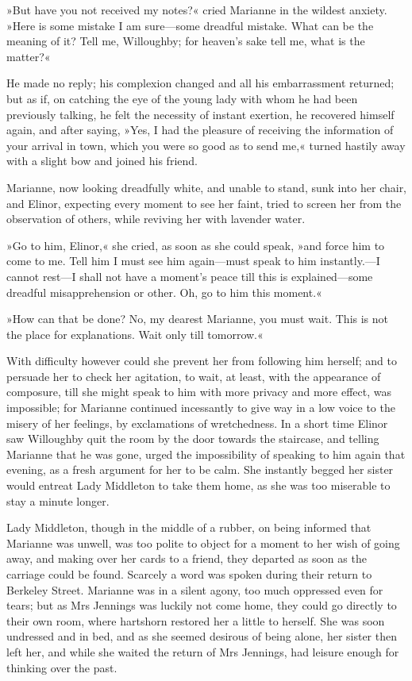 »But have you not received my notes?« cried Marianne in the wildest anxiety. »Here is some mistake I am sure—some dreadful mistake. What can be the meaning of it? Tell me, Willoughby; for heaven’s sake tell me, what is the matter?«

He made no reply; his complexion changed and all his embarrassment returned; but as if, on catching the eye of the young lady with whom he had been previously talking, he felt the necessity of instant exertion, he recovered himself again, and after saying, »Yes, I had the pleasure of receiving the information of your arrival in town, which you were so good as to send me,« turned hastily away with a slight bow and joined his friend.

Marianne, now looking dreadfully white, and unable to stand, sunk into her chair, and Elinor, expecting every moment to see her faint, tried to screen her from the observation of others, while reviving her with lavender water.

»Go to him, Elinor,« she cried, as soon as she could speak, »and force him to come to me. Tell him I must see him again—must speak to him instantly.—I cannot rest—I shall not have a moment’s peace till this is explained—some dreadful misapprehension or other. Oh, go to him this moment.«

»How can that be done? No, my dearest Marianne, you must wait. This is not the place for explanations. Wait only till tomorrow.«

With difficulty however could she prevent her from following him herself; and to persuade her to check her agitation, to wait, at least, with the appearance of composure, till she might speak to him with more privacy and more effect, was impossible; for Marianne continued incessantly to give way in a low voice to the misery of her feelings, by exclamations of wretchedness. In a short time Elinor saw Willoughby quit the room by the door towards the staircase, and telling Marianne that he was gone, urged the impossibility of speaking to him again that evening, as a fresh argument for her to be calm. She instantly begged her sister would entreat Lady Middleton to take them home, as she was too miserable to stay a minute longer.

Lady Middleton, though in the middle of a rubber, on being informed that Marianne was unwell, was too polite to object for a moment to her wish of going away, and making over her cards to a friend, they departed as soon as the carriage could be found. Scarcely a word was spoken during their return to Berkeley Street. Marianne was in a silent agony, too much oppressed even for tears; but as Mrs Jennings was luckily not come home, they could go directly to their own room, where hartshorn restored her a little to herself. She was soon undressed and in bed, and as she seemed desirous of being alone, her sister then left her, and while she waited the return of Mrs Jennings, had leisure enough for thinking over the past.

